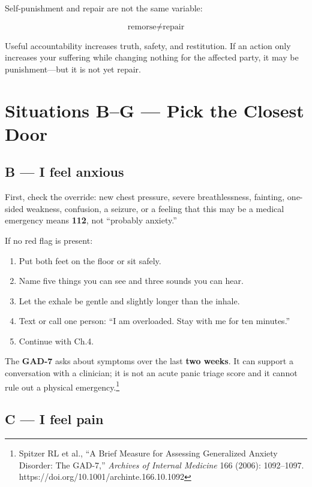 Self-punishment and repair are not the same variable:

\[\text{remorse} \neq \text{repair}\]

Useful accountability increases truth, safety, and restitution. If an
action only increases your suffering while changing nothing for the
affected party, it may be punishment---but it is not yet repair.

\hypertarget{03-situations-b-g}{}
\hypertarget{situations-bg-pick-the-closest-door}{%
\section{Situations B--G --- Pick the Closest
Door}\label{situations-bg-pick-the-closest-door}}

\hypertarget{b-i-feel-anxious}{%
\subsection{B --- I feel anxious}\label{b-i-feel-anxious}}

First, check the override: new chest pressure, severe breathlessness,
fainting, one-sided weakness, confusion, a seizure, or a feeling that
this may be a medical emergency means \textbf{112}, not ``probably
anxiety.''

If no red flag is present:

\begin{enumerate}
\def\labelenumi{\arabic{enumi}.}
\tightlist
\item
  Put both feet on the floor or sit safely.
\item
  Name five things you can see and three sounds you can hear.
\item
  Let the exhale be gentle and slightly longer than the inhale.
\item
  Text or call one person: ``I am overloaded. Stay with me for ten
  minutes.''
\item
  Continue with Ch.4.
\end{enumerate}

The \textbf{GAD-7} asks about symptoms over the last \textbf{two weeks}.
It can support a conversation with a clinician; it is not an acute panic
triage score and it cannot rule out a physical emergency.\footnote{Spitzer
  RL et al., ``A Brief Measure for Assessing Generalized Anxiety
  Disorder: The GAD-7,'' \emph{Archives of Internal Medicine} 166
  (2006): 1092--1097. https://doi.org/10.1001/archinte.166.10.1092}

\hypertarget{c-i-feel-pain}{%
\subsection{C --- I feel pain}\label{c-i-feel-pain}}

